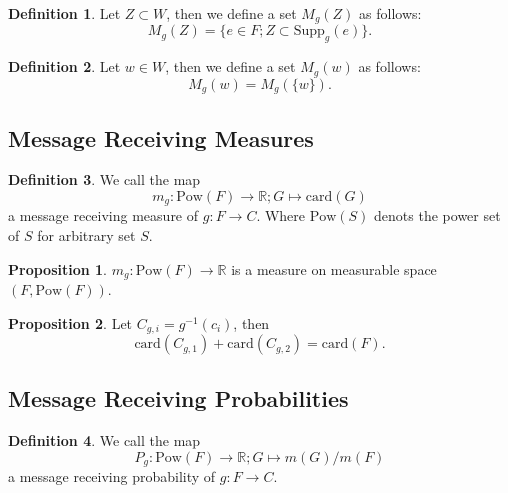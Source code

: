 \documentclass[11pt, a4note]{article}
\theoremstyle{definition}
\newtheorem{definition}{Definition}[section]
\newtheorem{proposition}{Proposition}[section]
\begin{document}
\begin{definition}
Let $ Z \subset W $, then we define a set $ M_{g}(Z) $ as follows:
\begin{equation}
M_{g}(Z) = \{e \in F ; Z \subset \mathrm{Supp}_{g}(e)\}.
\end{equation}
\end{definition}

\begin{definition}
Let $ w \in W $, then we define a set $ M_{g}(w) $ as follows:
\begin{equation}
M_{g}(w) = M_{g}(\{w\}).
\end{equation}
\end{definition}

\subsection{Message Receiving Measures}

\begin{definition}
We call the map
\begin{equation}
m_{g} : \mathrm{Pow}(F) \to \mathbb{R} ; G \mapsto \mathrm{card}(G)
\end{equation}
a message receiving measure of $ g : F \to C $.
Where $ \mathrm{Pow}(S) $ denots the power set of $ S $ for arbitrary set $ S $.
\end{definition}

\begin{proposition}
$ m_{g} : \mathrm{Pow}(F) \to \mathbb{R} $ is a measure on measurable space $ (F, \mathrm{Pow}(F)) $.
\end{proposition}

\begin{proposition}
Let $ C_{g,i} = g^{-1}(c_{i}) $, then
\begin{equation}
\mathrm{card}(C_{g,1}) + \mathrm{card}(C_{g,2}) = \mathrm{card}(F).
\end{equation}
\end{proposition}

\subsection{Message Receiving Probabilities}

\begin{definition}
We call the map
\begin{equation}
P_{g} : \mathrm{Pow}(F) \to \mathbb{R} ; G \mapsto m(G)/m(F)
\end{equation}
a message receiving probability of $ g : F \to C $.
\end{definition}
\end{document}
